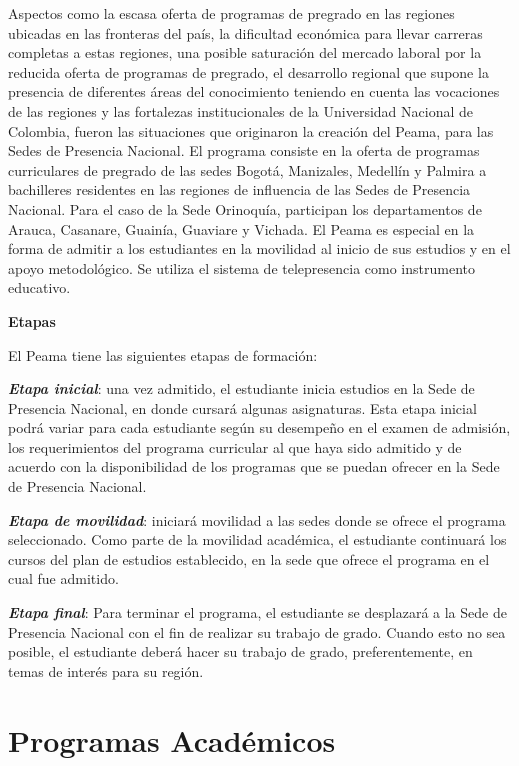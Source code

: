\documentclass[
]{book}
\begin{document}
Aspectos como la escasa oferta de programas de pregrado en las regiones ubicadas en las fronteras del país, la dificultad económica para llevar carreras completas a estas regiones, una posible saturación del mercado laboral por la reducida oferta de programas de pregrado, el desarrollo regional que supone la presencia de diferentes áreas del conocimiento teniendo en cuenta las vocaciones de las regiones y las fortalezas institucionales de la Universidad Nacional de Colombia, fueron las situaciones que originaron la creación del Peama, para las Sedes de Presencia Nacional. El programa consiste en la oferta de programas curriculares de pregrado de las sedes Bogotá, Manizales, Medellín y Palmira a bachilleres residentes en las regiones de influencia de las Sedes de Presencia Nacional. Para el caso de la Sede Orinoquía, participan los departamentos de Arauca, Casanare, Guainía, Guaviare y Vichada. El Peama es especial en la forma de admitir a los estudiantes en la movilidad al inicio de sus estudios y en el apoyo metodológico. Se utiliza el sistema de telepresencia como instrumento educativo.

\textbf{Etapas}

El Peama tiene las siguientes etapas de formación:

\emph{\textbf{Etapa inicial}}: una vez admitido, el estudiante inicia estudios en la Sede de Presencia Nacional, en donde cursará algunas asignaturas. Esta etapa inicial podrá variar para cada estudiante según su desempeño en el examen de admisión, los requerimientos del programa curricular al que haya sido admitido y de acuerdo con la disponibilidad de los programas que se puedan ofrecer en la Sede de Presencia Nacional.

\emph{\textbf{Etapa de movilidad}}: iniciará movilidad a las sedes donde se ofrece el programa seleccionado. Como parte de la movilidad académica, el estudiante continuará los cursos del plan de estudios establecido, en la sede que ofrece el programa en el cual fue admitido.

\emph{\textbf{Etapa final}}: Para terminar el programa, el estudiante se desplazará a la Sede de Presencia Nacional con el fin de realizar su trabajo de grado. Cuando esto no sea posible, el estudiante deberá hacer su trabajo de grado, preferentemente, en temas de interés para su región.

\hypertarget{Prog}{%
\chapter{Programas Académicos}\label{Prog}}
\end{document}
